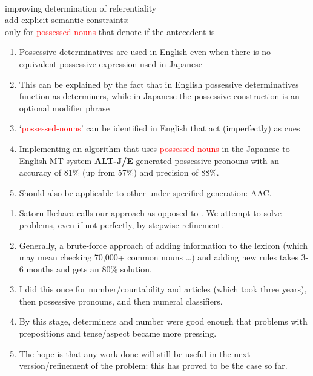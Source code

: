 \documentclass[a4paper,landscape,headrule,footrule,xetex]{foils}
\newcommand{\trg}[1]{\textcolor{red}{#1}}
\newcommand{\hsp}{\hspace*{1.5cm}}
\newcommand{\hhsp}{\hspace*{2.5cm}}
\begin{document}
 \\
\hsp improving determination of referentiality \\
\hsp add explicit semantic constraints: \\only  
for \trg{possessed-nouns} that denote   if the antecedent is 


  \begin{enumerate}
  \item Possessive determinatives are used in English even when there
    is no equivalent possessive expression used in Japanese
  \item This can be explained by the fact that in English possessive
    determinatives function as determiners, while in Japanese the
    possessive construction is an optional modifier phrase
  \item `\trg{possessed-nouns}' can be identified in English that act
    (imperfectly) as cues
  \item Implementing an algorithm  that uses
    \trg{possessed-nouns} in the Japanese-to-English MT system {\bf
      ALT-J/E} generated possessive pronouns with an accuracy of
    81\% (up from 57\%) and precision of 88\%.
  \item Should also be applicable to other under-specified generation: AAC.
  \end{enumerate}


\begin{enumerate}\addtolength{\itemsep}{-3mm}
\item Satoru Ikehara calls our approach  as opposed
  to .  We attempt to
  solve problems, even if not perfectly, by stepwise refinement.
\item Generally, a brute-force approach of adding information to the lexicon
  (which may mean checking 70,000+ common nouns \ldots) and adding new
  rules takes 3-6 months and gets an 80\% solution.
\item I did this once for number/countability and articles (which took
  three years), then possessive pronouns, and then numeral
  classifiers. 
\item By this stage, determiners and number were good enough that problems with
  prepositions and tense/aspect became more pressing.
\item The hope is that any work done will still be useful in the next
  version/refinement of the problem: this has proved to be the case so
  far.

\end{enumerate}
\end{document}
